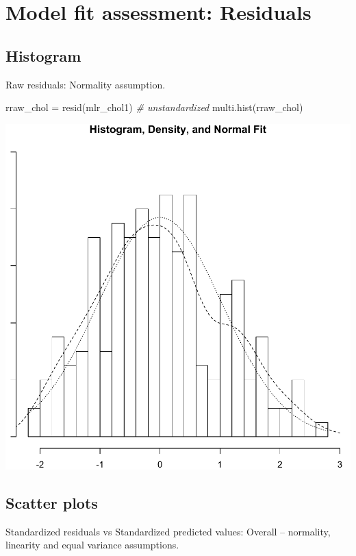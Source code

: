 \documentclass[
]{book}
\makeatletter
\newenvironment{Shaded}{\begin{snugshade}}{\end{snugshade}}
\newcommand{\CommentTok}[1]{\textcolor[rgb]{0.37,0.37,0.37}{\textit{#1}}}
\newcommand{\FunctionTok}[1]{\textcolor[rgb]{0,0,0}{#1}}
\newcommand{\NormalTok}[1]{#1}
\newcommand{\OtherTok}[1]{\textcolor[rgb]{0.37,0.37,0.37}{#1}}
\newenvironment{kframe}{%
\medskip{}
\setlength{\fboxsep}{.8em}
 \def\at@end@of@kframe{}%
 \ifinner\ifhmode%
  \def\at@end@of@kframe{\end{minipage}}%
  \begin{minipage}{\columnwidth}%
 \fi\fi%
 \def\FrameCommand##1{\hskip\@totalleftmargin \hskip-\fboxsep
 \colorbox{shadecolor}{##1}\hskip-\fboxsep
     \hskip-\linewidth \hskip-\@totalleftmargin \hskip\columnwidth}%
 \MakeFramed {\advance\hsize-\width
   \@totalleftmargin\z@ \linewidth\hsize
   \@setminipage}}%
 {\par\unskip\endMakeFramed%
 \at@end@of@kframe}
\renewenvironment{Shaded}{\begin{kframe}}{\end{kframe}}
\makeatother
\begin{document}
\hypertarget{model-fit-assessment-residuals}{%
\section{Model fit assessment: Residuals}\label{model-fit-assessment-residuals}}

\hypertarget{histogram-1}{%
\subsection*{Histogram}\label{histogram-1}}


Raw residuals: Normality assumption.

\begin{Shaded}
\begin{Highlighting}[]
\NormalTok{rraw\_chol }\OtherTok{=} \FunctionTok{resid}\NormalTok{(mlr\_chol1)  }\CommentTok{\# unstandardized}
\FunctionTok{multi.hist}\NormalTok{(rraw\_chol)}
\end{Highlighting}
\end{Shaded}

\begin{center}\includegraphics[width=0.7\linewidth,keepaspectratio]{Multivariable_Data_Analysis_files/figure-latex/unnamed-chunk-118-1} \end{center}

\hypertarget{scatter-plots}{%
\subsection*{Scatter plots}\label{scatter-plots}}


Standardized residuals vs Standardized predicted values: Overall -- normality, linearity and equal variance assumptions.
\end{document}
